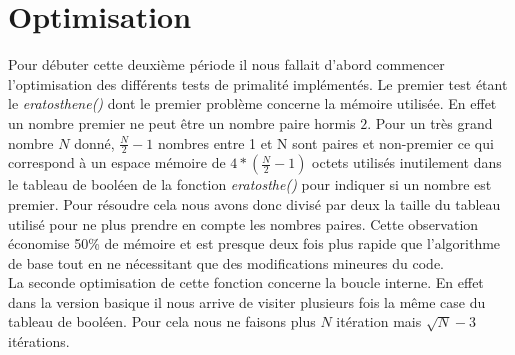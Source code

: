 		
	\section{Optimisation}
	Pour débuter cette deuxième période il nous fallait d'abord commencer l'optimisation des différents tests de primalité implémentés. Le premier test étant le \textit{eratosthene()} dont le premier problème concerne la mémoire utilisée. En effet un nombre premier ne peut être un nombre paire hormis $2$. Pour un très grand nombre $N$ donné, $\frac{N}{2}-1$ nombres entre 1 et N sont paires et non-premier ce qui correspond à un espace mémoire de $4*(\frac{N}{2}-1)$ octets utilisés inutilement dans le tableau de booléen de la fonction \textit{eratosthe()} pour indiquer si un nombre est premier. Pour résoudre cela nous avons donc divisé par deux la taille du tableau utilisé pour ne plus prendre en compte les nombres paires. Cette observation économise 50\% de mémoire et est presque deux fois plus rapide que l'algorithme de base tout en ne nécessitant que des modifications mineures du code.\\
La seconde optimisation de cette fonction concerne la boucle interne. En effet dans la version basique il nous arrive de visiter plusieurs fois la même case du tableau de booléen. Pour cela nous ne faisons plus $N$ itération mais $\sqrt{N}-3$ itérations.

